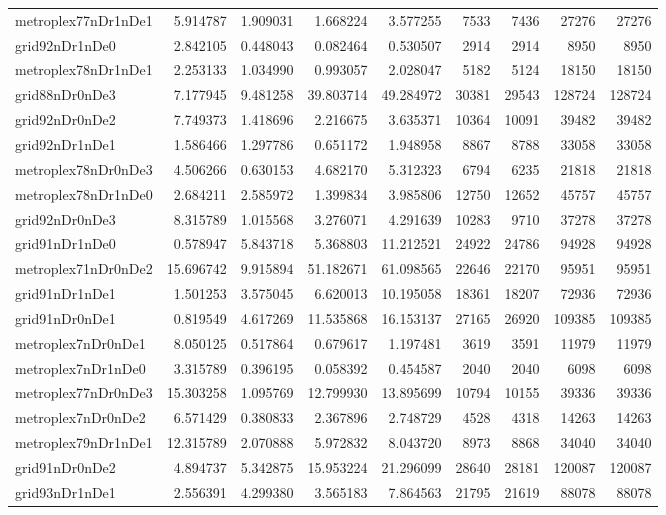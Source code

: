 \begin{longtable}{|l|r|r|r|r|r|r|r|r|}
metroplex77nDr1nDe1 & 5.914787 & 1.909031 & 1.668224 & 3.577255 & 7533 & 7436 & 27276 & 27276 \\
grid92nDr1nDe0 & 2.842105 & 0.448043 & 0.082464 & 0.530507 & 2914 & 2914 & 8950 & 8950 \\
metroplex78nDr1nDe1 & 2.253133 & 1.034990 & 0.993057 & 2.028047 & 5182 & 5124 & 18150 & 18150 \\
grid88nDr0nDe3 & 7.177945 & 9.481258 & 39.803714 & 49.284972 & 30381 & 29543 & 128724 & 128724 \\
grid92nDr0nDe2 & 7.749373 & 1.418696 & 2.216675 & 3.635371 & 10364 & 10091 & 39482 & 39482 \\
grid92nDr1nDe1 & 1.586466 & 1.297786 & 0.651172 & 1.948958 & 8867 & 8788 & 33058 & 33058 \\
metroplex78nDr0nDe3 & 4.506266 & 0.630153 & 4.682170 & 5.312323 & 6794 & 6235 & 21818 & 21818 \\
metroplex78nDr1nDe0 & 2.684211 & 2.585972 & 1.399834 & 3.985806 & 12750 & 12652 & 45757 & 45757 \\
grid92nDr0nDe3 & 8.315789 & 1.015568 & 3.276071 & 4.291639 & 10283 & 9710 & 37278 & 37278 \\
grid91nDr1nDe0 & 0.578947 & 5.843718 & 5.368803 & 11.212521 & 24922 & 24786 & 94928 & 94928 \\
metroplex71nDr0nDe2 & 15.696742 & 9.915894 & 51.182671 & 61.098565 & 22646 & 22170 & 95951 & 95951 \\
grid91nDr1nDe1 & 1.501253 & 3.575045 & 6.620013 & 10.195058 & 18361 & 18207 & 72936 & 72936 \\
grid91nDr0nDe1 & 0.819549 & 4.617269 & 11.535868 & 16.153137 & 27165 & 26920 & 109385 & 109385 \\
metroplex7nDr0nDe1 & 8.050125 & 0.517864 & 0.679617 & 1.197481 & 3619 & 3591 & 11979 & 11979 \\
metroplex7nDr1nDe0 & 3.315789 & 0.396195 & 0.058392 & 0.454587 & 2040 & 2040 & 6098 & 6098 \\
metroplex77nDr0nDe3 & 15.303258 & 1.095769 & 12.799930 & 13.895699 & 10794 & 10155 & 39336 & 39336 \\
metroplex7nDr0nDe2 & 6.571429 & 0.380833 & 2.367896 & 2.748729 & 4528 & 4318 & 14263 & 14263 \\
metroplex79nDr1nDe1 & 12.315789 & 2.070888 & 5.972832 & 8.043720 & 8973 & 8868 & 34040 & 34040 \\
grid91nDr0nDe2 & 4.894737 & 5.342875 & 15.953224 & 21.296099 & 28640 & 28181 & 120087 & 120087 \\
grid93nDr1nDe1 & 2.556391 & 4.299380 & 3.565183 & 7.864563 & 21795 & 21619 & 88078 & 88078 \\

\end{longtable}
